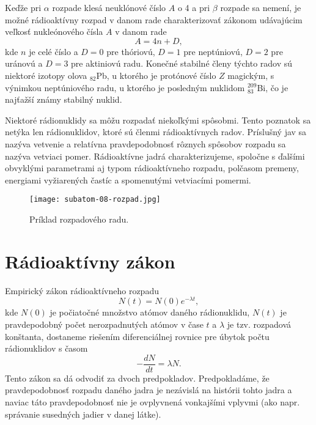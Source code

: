 \documentclass[../../main.tex]{subfiles}
\begin{document}
Keďže pri $\alpha$ rozpade klesá neuklónové číslo $A$ o 4 a pri $\beta$ rozpade sa nemení, je možné rádioaktívny rozpad v danom rade charakterizovať zákonom udávajúcim veľkosť nukleónového čísla $A$ v danom rade
$$ A = 4n + D,$$
kde $n$ je celé číslo a $D=0$ pre thóriovú, $D=1$ pre neptúniovú, $D=2$ pre uránovú a $D=3$ pre aktiniovú radu. Konečné stabilné členy týchto radov sú niektoré izotopy olova $_{82}$Pb, u ktorého je protónové číslo $Z$ magickým, s výnimkou neptúniového radu, u ktorého je posledným nuklidom $_{83}^{209}$Bi, čo je najťažší známy stabilný nuklid. 

Niektoré rádionuklidy sa môžu rozpadať niekoľkými spôsobmi. Tento poznatok sa netýka len rádionuklidov, ktoré sú členmi rádioaktívnych radov. Príslušný jav sa nazýva vetvenie a relatívna pravdepodobnosť rôznych spôsobov rozpadu sa nazýva vetviaci pomer. Rádioaktívne jadrá charakterizujeme, spoločne s ďalšími obvyklými parametrami aj typom rádioaktívneho rozpadu, polčasom premeny, energiami vyžiarených častíc a spomenutými vetviacími pomermi.

\begin{figure}[!h]
\texttt{[image: subatom-08-rozpad.jpg]}
\centering
\caption{Príklad rozpadového radu.}
\label{sf8:fig:rozpad}
\end{figure}

\section{Rádioaktívny zákon}
Empirický zákon rádioaktívneho rozpadu
\begin{equation}
N(t) = N(0)e^{-\lambda t},
\end{equation}
kde $N(0)$ je počiatočné množstvo atómov daného rádionuklidu, $N(t)$ je pravdepodobný počet nerozpadnutých atómov v čase $t$ a $\lambda$ je tzv. rozpadová konštanta, dostaneme riešením diferenciálnej rovnice pre úbytok počtu rádionuklidov s časom
\begin{equation}
-\frac{dN}{dt} = \lambda N . 
\end{equation}
Tento zákon sa dá odvodiť za dvoch predpokladov. Predpokladáme, že pravdepodobnosť rozpadu daného jadra je nezávislá na histórii tohto jadra a naviac táto pravdepodobnosť nie je ovplyvnená vonkajšími vplyvmi (ako napr. správanie susedných jadier v danej látke).
\end{document}
